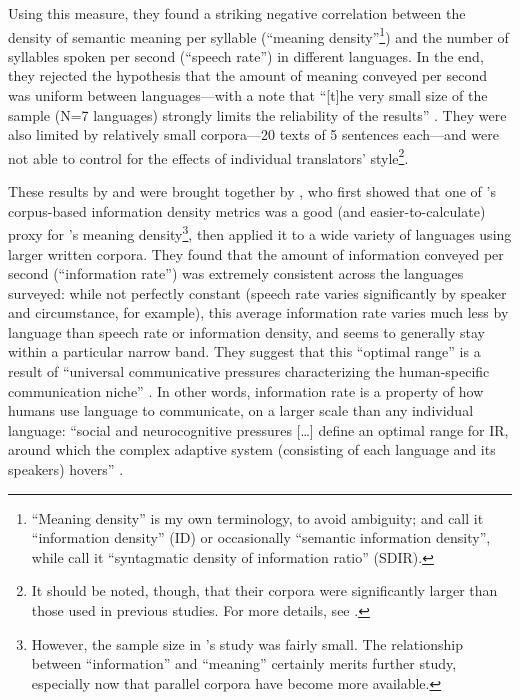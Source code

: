 \documentclass[12pt,twoside]{article}
\begin{document}
Using this measure, they found a striking negative correlation between the density of semantic meaning per syllable (``meaning density''\footnote{``Meaning density'' is my own terminology, to avoid ambiguity; \citet{pellegrino} and \citet{oh} call it ``information density'' (ID) or occasionally ``semantic information density'', while \citet{coupé} call it ``syntagmatic density of information ratio'' (SDIR).}) and the number of syllables spoken per second (``speech rate'') in different languages. In the end, they rejected the hypothesis that the amount of meaning conveyed per second was uniform between languages---with a note that ``[t]he very small size of the sample (N=7 languages) strongly limits the reliability of the results'' \citep[550]{pellegrino}. They were also limited by relatively small corpora---20 texts of 5 sentences each---and were not able to control for the effects of individual translators' style\footnote{It should be noted, though, that their corpora were significantly larger than those used in previous studies. For more details, see \citep[545]{pellegrino}.}.

These results by \citet{oh} and \citet{pellegrino} were brought together by \citet{coupé}, who first showed that one of \citeauthor{oh}'s corpus-based information density metrics was a good (and easier-to-calculate) proxy for \citeauthor{pellegrino}'s meaning density\footnote{However, the sample size in \citeauthor{pellegrino}'s study was fairly small. The relationship between ``information'' and ``meaning'' certainly merits further study, especially now that parallel corpora have become more available.}, then applied it to a wide variety of languages using larger written corpora. They found that the amount of information conveyed per second (``information rate'') was extremely consistent across the languages surveyed: while not perfectly constant (speech rate varies significantly by speaker and circumstance, for example), this average information rate varies much less by language than speech rate or information density, and seems to generally stay within a particular narrow band. They suggest that this ``optimal range'' is a result of ``universal communicative pressures characterizing the human-specific communication niche'' \citep[6]{coupé}. In other words, information rate is a property of how humans use language to communicate, on a larger scale than any individual language: ``social and neurocognitive pressures [\ldots] define an optimal range for IR, around which the complex adaptive system (consisting of each language and its speakers) hovers'' \citep[6]{coupé}.
\end{document}
